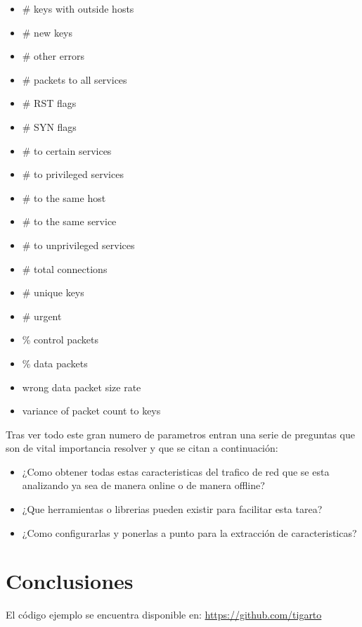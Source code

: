\documentclass[12pt]{article}
\begin{document}
\begin{itemize}
\item \# keys with outside hosts
\item \# new keys
\item \# other errors
\item \# packets to all services
\item \# RST flags
\item \# SYN flags
\item \# to certain services
\item \# to privileged services
\item \# to the same host
\item \# to the same service
\item \# to unprivileged services
\item \# total connections
\item \# unique keys
\item \# urgent
\item \% control packets
\item \% data packets
\item wrong data packet size rate
\item variance of packet count to keys
\end{itemize}

Tras ver todo este gran numero de parametros entran una serie de preguntas que son de vital importancia resolver y que se citan a continuación: 
\begin{itemize}
\item ¿Como obtener todas estas caracteristicas del trafico de red que se esta analizando ya sea de manera online o de manera offline?
\item ¿Que herramientas o librerias pueden existir para facilitar esta tarea?
\item ¿Como configurarlas y ponerlas a punto para la extracción de caracteristicas?
\end{itemize}




\section{Conclusiones}




El código ejemplo se encuentra disponible en: \url{https://github.com/tigarto}



\end{document}
